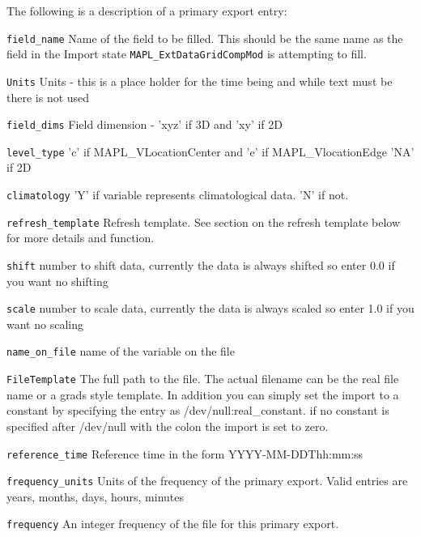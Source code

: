 The following is a description of a primary export entry:
\begin{trivlist}
\item[\tt field\_name]        Name of the field to be filled. This should be the same 
                              name as the field in the Import state {\tt MAPL\_ExtDataGridCompMod}
                              is attempting to fill.
\item[\tt Units]              Units - this is a place holder for the time being and while text must
                              be there is not used
\item[\tt field\_dims]        Field dimension - 'xyz' if 3D and 'xy' if 2D
\item[\tt level\_type]        'c' if MAPL\_VLocationCenter and 'e' if MAPL\_VlocationEdge 'NA' if 2D
\item[\tt climatology]        'Y' if variable represents climatological data. 'N' if not.
\item[\tt refresh\_template]  Refresh template. See section on the refresh template below for more details and function.
\item[\tt shift]              number to shift data, currently the data is always shifted so enter 0.0 if you want no shifting
\item[\tt scale]              number to scale data, currently the data is always scaled so enter 1.0 if you want no scaling
\item[\tt name\_on\_file]     name of the variable on the file
\item[\tt FileTemplate]       The full path to the file. The actual filename can be the real file name or a grads
                              style template. In addition you can simply set the import to a constant by specifying the 
                              entry as /dev/null:real\_constant. if no constant is specified after /dev/null with the colon
                              the import is set to zero.
\item[\tt reference\_time]    Reference time in the form YYYY-MM-DDThh:mm:ss
\item[\tt frequency\_units]   Units of the frequency of the primary export. Valid entries are years, months, days, hours, minutes
\item[\tt frequency]          An integer frequency of the file for this primary export.
\end{trivlist}

